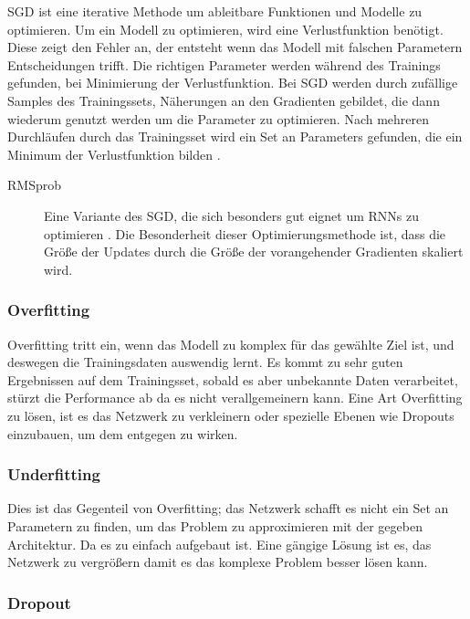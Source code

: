 \documentclass[pdftex,a4paper,halfparskip, article]{scrartcl}
\begin{document}
SGD ist eine iterative Methode um ableitbare Funktionen und Modelle zu optimieren. Um ein Modell zu optimieren, wird eine Verlustfunktion benötigt. Diese zeigt den Fehler an, der entsteht wenn das Modell mit falschen Parametern Entscheidungen trifft. Die richtigen Parameter werden während des Trainings gefunden, bei Minimierung der Verlustfunktion.
Bei SGD werden durch zufällige Samples des Trainingssets, Näherungen an den Gradienten gebildet, die dann wiederum genutzt werden um die Parameter zu optimieren. Nach mehreren Durchläufen durch das Trainingsset wird ein Set an Parameters gefunden, die ein Minimum der Verlustfunktion bilden \cite{walkSGD}. 

\begin{description}
	\item[RMSprob] Eine Variante des SGD, die sich besonders gut eignet um RNNs zu optimieren \cite{kerasDocRMSprob}. Die Besonderheit dieser Optimierungsmethode ist, dass die Größe der Updates durch die Größe der vorangehender Gradienten skaliert wird.
\end{description}

\subsubsection{Overfitting}
	
Overfitting tritt ein, wenn das Modell zu komplex für das gewählte Ziel ist, und deswegen die Trainingsdaten auswendig lernt. Es kommt zu sehr guten Ergebnissen auf dem Trainingsset, sobald es aber unbekannte Daten verarbeitet, stürzt die Performance ab da es nicht verallgemeinern kann. Eine Art Overfitting zu lösen, ist es das Netzwerk zu verkleinern oder spezielle Ebenen wie Dropouts einzubauen, um dem entgegen zu wirken.

\subsubsection{Underfitting}

Dies ist das Gegenteil von Overfitting; das Netzwerk schafft es nicht ein Set an Parametern zu finden, um das Problem zu approximieren mit der gegeben Architektur. Da es zu einfach aufgebaut ist. Eine gängige Lösung ist es, das Netzwerk zu vergrößern damit es das komplexe Problem besser lösen kann.

\subsubsection{Dropout}
\end{document}
